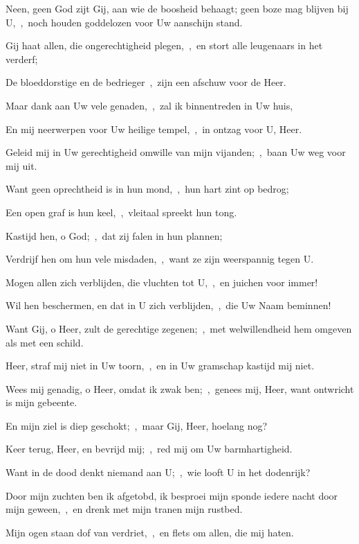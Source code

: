 \documentclass[12pt,twoside,a5paper]{article}
\begin{document}
\begin{halfparskip}
  Neen, geen God zijt Gij, aan wie de boosheid behaagt; geen boze mag blijven bij U,~\sep\ noch houden goddelozen voor Uw aanschijn stand.

  Gij haat allen, die ongerechtigheid plegen,~\sep\ en stort alle leugenaars in het verderf;

  De bloeddorstige en de bedrieger~\sep\ zijn een afschuw voor de Heer.

  Maar dank aan Uw vele genaden,~\sep\ zal ik binnentreden in Uw huis,

  En mij neerwerpen voor Uw heilige tempel,~\sep\ in ontzag voor U, Heer.

  Geleid mij in Uw gerechtigheid omwille van mijn vijanden;~\sep\ baan Uw weg voor mij uit.

  Want geen oprechtheid is in hun mond,~\sep\ hun hart zint op bedrog;

  Een open graf is hun keel,~\sep\ vleitaal spreekt hun tong.

  Kastijd hen, o God;~\sep\ dat zij falen in hun plannen;

  Verdrijf hen om hun vele misdaden,~\sep\ want ze zijn weerspannig tegen U.

  Mogen allen zich verblijden, die vluchten tot U,~\sep\ en juichen voor immer!

  Wil hen beschermen, en dat in U zich verblijden,~\sep\ die Uw Naam beminnen!

  Want Gij, o Heer, zult de gerechtige zegenen;~\sep\ met welwillendheid hem omgeven als met een schild.
\end{halfparskip}



\begin{halfparskip}
  Heer, straf mij niet in Uw toorn,~\sep\ en in Uw gramschap kastijd mij niet.


  Wees mij genadig, o Heer, omdat ik zwak ben;~\sep\ genees mij, Heer, want ontwricht is mijn gebeente.

  En mijn ziel is diep geschokt;~\sep\ maar Gij, Heer, hoelang nog?

  Keer terug, Heer, en bevrijd mij;~\sep\ red mij om Uw barmhartigheid.

  Want in de dood denkt niemand aan U;~\sep\ wie looft U in het dodenrijk?

  Door mijn zuchten ben ik afgetobd, ik besproei mijn sponde iedere nacht door mijn geween,~\sep\ en drenk met mijn tranen mijn rustbed.

  Mijn ogen staan dof van verdriet,~\sep\ en flets om allen, die mij haten.
\end{halfparskip}
\end{document}
